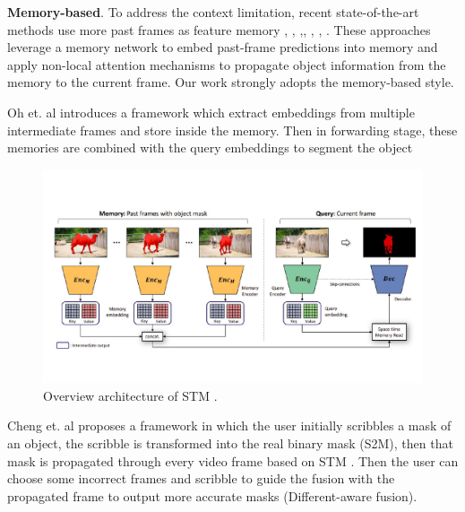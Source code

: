 \textbf{Memory-based}. To address the context limitation, recent state-of-the-art methods use more past frames as feature memory \cite{oh2019stm}, \cite{duarte2019capsulevos}, \cite{huang2020fast} ,\cite{ge2021video}, \cite{cheng2021stcn}, \cite{cheng2022xmem}, \cite{yang2022associating}. These approaches leverage a memory network to embed past-frame predictions into memory and apply non-local attention mechanisms to propagate object information from the memory to the current frame. Our work strongly adopts the memory-based style. 

Oh et. al \cite{oh2019stm} introduces a framework which extract embeddings from multiple intermediate frames and store inside the memory. Then in forwarding stage, these memories are combined with the query embeddings to segment the object

\begin{figure}[!h]
    \centering
    \includegraphics[width=\textwidth]{content/resources/new_images/models/stm.pdf}
    \caption{Overview architecture of STM \cite{oh2019stm}.}
    \label{fig:stm}
\end{figure}

Cheng et. al  \cite{cheng2021mivos} proposes a framework in which the user initially scribbles a mask of an object, the scribble is transformed into the real binary mask (S2M), then that mask is propagated through every video frame based on STM \cite{oh2019stm}. Then the user can choose some incorrect frames and scribble to guide the fusion with the propagated frame to output more accurate masks (Different-aware fusion).

